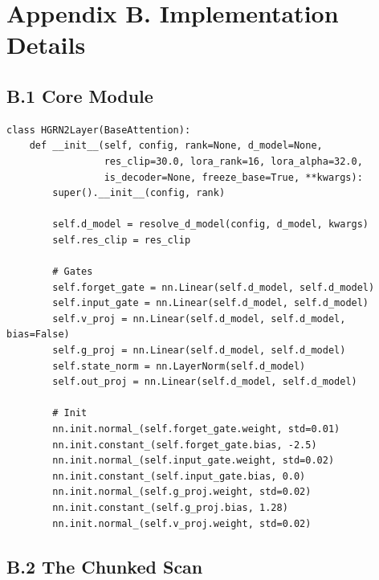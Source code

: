\section{Appendix B. Implementation Details}

\subsection{B.1 Core Module}

\begin{lstlisting}
class HGRN2Layer(BaseAttention):
    def __init__(self, config, rank=None, d_model=None, 
                 res_clip=30.0, lora_rank=16, lora_alpha=32.0, 
                 is_decoder=None, freeze_base=True, **kwargs):
        super().__init__(config, rank)
        
        self.d_model = resolve_d_model(config, d_model, kwargs)
        self.res_clip = res_clip
        
        # Gates
        self.forget_gate = nn.Linear(self.d_model, self.d_model)
        self.input_gate = nn.Linear(self.d_model, self.d_model)
        self.v_proj = nn.Linear(self.d_model, self.d_model, bias=False)
        self.g_proj = nn.Linear(self.d_model, self.d_model)
        self.state_norm = nn.LayerNorm(self.d_model)
        self.out_proj = nn.Linear(self.d_model, self.d_model)
        
        # Init
        nn.init.normal_(self.forget_gate.weight, std=0.01)
        nn.init.constant_(self.forget_gate.bias, -2.5)
        nn.init.normal_(self.input_gate.weight, std=0.02)
        nn.init.constant_(self.input_gate.bias, 0.0)
        nn.init.normal_(self.g_proj.weight, std=0.02)
        nn.init.constant_(self.g_proj.bias, 1.28)
        nn.init.normal_(self.v_proj.weight, std=0.02)
\end{lstlisting}

\subsection{B.2 The Chunked Scan}

